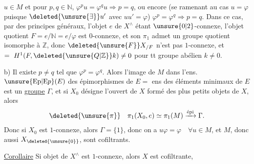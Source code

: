 
$u\in M$ et pour $p,q\in\mathbb N$, $\varphi^pu=\varphi^qu\Longrightarrow p=q$,
ou encore  (se ramenant au cas $u=\varphi$
puisque $\deleted{\unsure{\exists}}u'$ avec $uu'=\varphi$) $\varphi^p=\varphi^q\Longrightarrow p=q$.
Dans ce cas, par des principes généraux,
 l'objet $e$ de $X^\wedge$ étant $\unsure{0|2}$-connexe,
l'objet quotient $F=e/\mathbb N=e/\varphi$ est $0$-connexe,
et son $\pi_1$ admet un groupe quotient isomorphe
à $\mathbb Z$, donc $\deleted{\unsure{F}}X_{/F}$ n'est pas $1$-connexe,
et $=\ H^1(F,\deleted{\unsure{Q|\mathbb Z}}k)\ne0$ pour tt groupe
abélien $k\ne0$.

b) Il existe $p\ne q$ tel que $\varphi^p=\varphi^q$. Alors
 l'image de $M$ dans l'ens.
$\unsure{\mathrm{Ep}|\mathrm{E}p}(E)$ des épimorphismes de $E=$ ens des
éléments minimaux de $E$ est un \uline{groupe}
$\Gamma$, et si $X_0$ désigne l'ouvert de $X$
formé des plus petits objets de $X$, alors
\[
\deleted{\unsure{\pi}}\quad \pi_1(X_0,e)\simeq\pi_1(M)\xrightarrow{\text{épi}}\Gamma.
\]
Donc si $X_0$ est $1$-connexe, alors $\Gamma=\{1\}$, donc
on a $u\varphi=\varphi\quad\forall u\in M$, et $M$,  donc
aussi $X_{\deleted{\unsure{0}}}$,  sont cofiltrants. 

\uline{Corollaire} Si  objet de $X^\wedge$ est $1$-connexe,
alors $X$ est cofiltrante,


